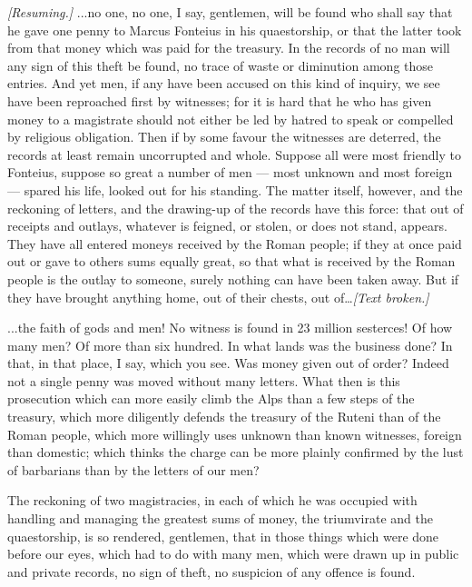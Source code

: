  \textit{[Resuming.]} ...no one, no one, I say, gentlemen, will be found who shall say that he gave one penny to Marcus Fonteius in his quaestorship, or that the latter took from that money which was paid for the treasury. In the records of no man will any sign of this theft be found, no trace of waste or diminution among those entries. And yet men, if any have been accused on this kind of inquiry, we see have been reproached first by witnesses; for it is hard that he who has given money to a magistrate should not either be led by hatred to speak or compelled by religious obligation. Then if by some favour the witnesses are deterred, the records at least remain uncorrupted and whole. Suppose all were most friendly to Fonteius, suppose so great a number of men --- most unknown and most foreign --- spared his life, looked out for his standing. The matter itself, however, and the reckoning of letters, and the drawing-up of the records have this force: that out of receipts and outlays, whatever is feigned, or stolen, or does not stand, appears. They have all entered moneys received by the Roman people; if they at once paid out or gave to others sums equally great, so that what is received by the Roman people is the outlay to someone, surely nothing can have been taken away. But if they have brought anything home, out of their chests, out of\ldots \textit{[Text broken.]}

 ...the faith of gods and men! No witness is found in 23 million sesterces! Of how many men? Of more than six hundred. In what lands was the business done? In that, in that place, I say, which you see. Was money given out of order? Indeed not a single penny was moved without many letters. What then is this prosecution which can more easily climb the Alps than a few steps of the treasury, which more diligently defends the treasury of the Ruteni than of the Roman people, which more willingly uses unknown than known witnesses, foreign than domestic; which thinks the charge can be more plainly confirmed by the lust of barbarians than by the letters of our men?

 The reckoning of two magistracies, in each of which he was occupied with handling and managing the greatest sums of money, the triumvirate and the quaestorship, is so rendered, gentlemen, that in those things which were done before our eyes, which had to do with many men, which were drawn up in public and private records, no sign of theft, no suspicion of any offence is found.

